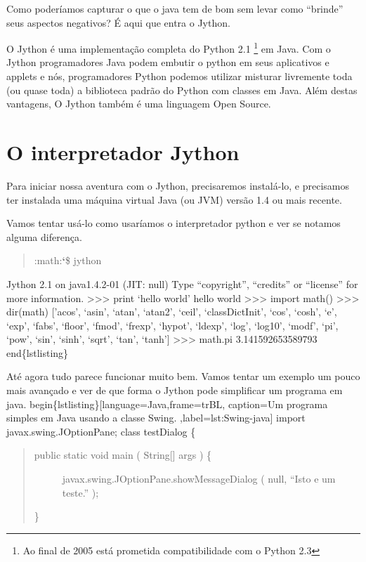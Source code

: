 \documentclass[a4paper,10pt,portuguese]{sphinxmanual}
\begin{document}
Como poderíamos capturar o que o java tem de bom sem levar como
``brinde'' seus aspectos negativos? É aqui que entra o Jython.

O Jython é uma implementação completa do Python 2.1 \footnote{
Ao final de 2005 está prometida compatibilidade com o Python 2.3
} em Java.
Com o Jython programadores Java podem embutir o python em seus
aplicativos e applets e nós, programadores Python podemos utilizar
misturar livremente toda (ou quase toda) a biblioteca padrão do
Python com classes em Java. Além destas vantagens, O Jython também
é uma linguagem Open Source.


\chapter{O interpretador Jython}
\label{jython:o-interpretador-jython}\label{jython::doc}
Para iniciar nossa aventura com o Jython, precisaremos instalá-lo,
e precisamos ter instalada uma máquina virtual Java (ou JVM) versão
1.4 ou mais recente.

Vamos tentar usá-lo como usaríamos o interpretador python e ver se
notamos alguma diferença.
\begin{quote}

:math:{\color{red}\bfseries{}{}`}\$ jython
\end{quote}

Jython 2.1 on java1.4.2-01 (JIT: null)
Type ``copyright'', ``credits'' or ``license'' for more information.
\textgreater{}\textgreater{}\textgreater{} print `hello world'
hello world
\textgreater{}\textgreater{}\textgreater{} import math()
\textgreater{}\textgreater{}\textgreater{} dir(math)
{[}'acos', `asin', `atan', `atan2', `ceil', `classDictInit', `cos', `cosh', `e', `exp', `fabs', `floor', `fmod', `frexp', `hypot', `ldexp', `log', `log10', `modf', `pi', `pow', `sin', `sinh', `sqrt', `tan', `tanh'{]}
\textgreater{}\textgreater{}\textgreater{} math.pi
3.141592653589793
end\{lstlisting\}

Até agora tudo parece funcionar muito bem. Vamos tentar um exemplo um pouco mais avançado e ver de que forma o Jython pode simplificar um programa em java.
begin\{lstlisting\}{[}language=Java,frame=trBL, caption=Um programa simples em Java usando a classe Swing. ,label=lst:Swing-java{]}
import javax.swing.JOptionPane;
class testDialog \{
\begin{quote}
\begin{description}
\item[{public static void main ( String{[}{]} args ) \{}] \leavevmode
javax.swing.JOptionPane.showMessageDialog ( null, ``Isto e um teste.'' );

\end{description}

\}
\end{quote}
\end{document}
